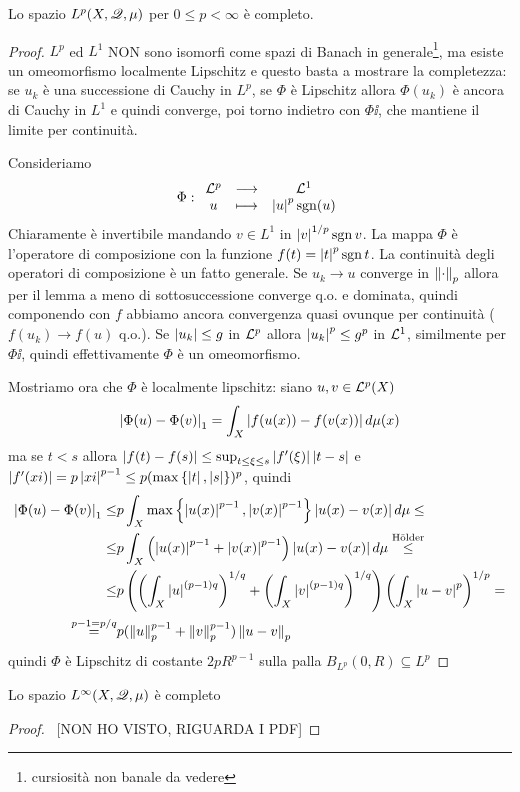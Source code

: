\begin{proposition}
Lo spazio $L^p(X,\Qs,\mu)$ per $0\leq p<\infty$ \`e completo.
\end{proposition}
\begin{proof}
$L^p$ ed $L^1$ NON sono isomorfi come spazi di Banach in generale\footnote{cursiosit\`a non banale da vedere}, ma esiste un omeomorfismo localmente Lipschitz e questo basta a mostrare la completezza: se $u_k$ \`e una successione di Cauchy in $L^p$, se $\Phi$ \`e Lipschitz allora $\Phi(u_k)$ \`e ancora di Cauchy in $L^1$ e quindi converge, poi torno indietro con $\Phi\ii$, che mantiene il limite per continuit\`a.


Consideriamo
\[\Phi:\funcDef{\Lc^p}{\Lc^1}{u}{\abs{u}^p\sgn(u)}\]
Chiaramente \`e invertibile mandando $v\in L^1$ in $\abs{v}^{1/p}\sgn v$. La mappa $\Phi$ \`e l'operatore di composizione con la funzione $f(t)=\abs{t}^p\sgn t$. La continuit\`a degli operatori di composizione \`e un fatto generale. Se $u_k\to u$ converge in $\normd_p$ allora per il lemma a meno di sottosuccessione converge q.o. e dominata, quindi componendo con $f$ abbiamo ancora convergenza quasi ovunque per continuit\`a ($f(u_k)\to f(u)$ q.o.). Se $\abs{u_k}\leq g$ in $\Lc^p$ allora $\abs{u_k}^p\leq g^p$ in $\Lc^1$, similmente per $\Phi\ii$, quindi effettivamente $\Phi$ \`e un omeomorfismo.


Mostriamo ora che $\Phi$ \`e localmente lipschitz: siano $u,v\in \Lc^p(X)$
\[\abs{\Phi(u)-\Phi(v)}_1=\int_X\abs{f(u(x))-f(v(x))}d\mu(x)\]
ma se $t<s$ allora $\abs{f(t)-f(s)}\leq \sup_{t\leq \xi\leq s}\abs{f'(\xi)}\abs{t-s}$ e $\abs{f'(xi)}=p\abs{xi}^{p-1}\leq p(\max\cpa{\abs t,\abs s})^p$, quindi
\begin{align*}
    \abs{\Phi(u)-\Phi(v)}_1\leq& p\int_X\max\cpa{\abs{u(x)}^{p-1},\abs{v(x)}^{p-1}}\abs{u(x)-v(x)}d\mu\leq\\
    \leq &p\int_X\pa{\abs{u(x)}^{p-1}+\abs{v(x)}^{p-1}}\abs{u(x)-v(x)}d\mu\pasgnl\leq{H\"older}\\
    \leq&p\pa{\pa{\int_X\abs{u}^{(p-1)q}}^{1/q}+\pa{\int_X\abs{v}^{(p-1)q}}^{1/q}}\pa{\int_X\abs{u-v}^p}^{1/p}=\\
    \pasgnlmath={p-1=p/q}&p(\norm u_p^{p-1}+\norm v_p^{p-1})\norm{u-v}_p
\end{align*}
quindi $\Phi$ \`e Lipschitz di costante $2pR^{p-1}$ sulla palla $B_{L^p}(0,R)\subseteq L^p$
\end{proof}



\begin{proposition}
Lo spazio $L^\infty(X,\Qs,\mu)$ \`e completo
\end{proposition}
\begin{proof}
~[NON HO VISTO, RIGUARDA I PDF]
\end{proof}

